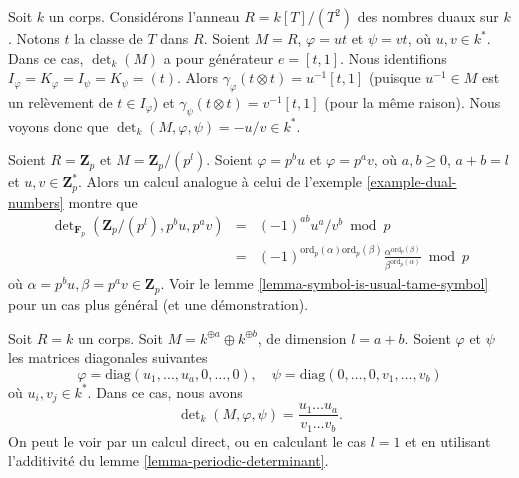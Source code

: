 \begin{example}
\label{example-dual-numbers}
Soit $k$ un corps.
Considérons l'anneau $R = k[T]/(T^2)$ des nombres duaux sur $k$.
Notons $t$ la classe de $T$ dans $R$.
Soient $M = R$, $\varphi = ut$ et $\psi = vt$, où $u, v \in k^*$.
Dans ce cas, $\det_k(M)$ a pour générateur $e = [t, 1]$.
Nous identifions $I_\varphi = K_\varphi = I_\psi = K_\psi = (t)$.
Alors $\gamma_\varphi(t \otimes t) = u^{-1}[t, 1]$
(puisque $u^{-1} \in M$ est un relèvement de $t \in I_\varphi$)
et $\gamma_\psi(t \otimes t) = v^{-1}[t, 1]$ (pour la même raison).
Nous voyons donc que $\det_k(M, \varphi, \psi) = -u/v \in k^*$.
\end{example}

\begin{example}
\label{example-Zp}
Soient $R = \mathbf{Z}_p$ et $M = \mathbf{Z}_p/(p^l)$.
Soient $\varphi = p^b u$ et $\varphi = p^a v$, où $a, b \geq 0$,
$a + b = l$ et $u, v \in \mathbf{Z}_p^*$.
Alors un calcul analogue à celui de l'exemple \ref{example-dual-numbers}
montre que
\begin{eqnarray*}
\det\nolimits_{\mathbf{F}_p}(\mathbf{Z}_p/(p^l), p^bu, p^av) & = &
(-1)^{ab}u^a/v^b \bmod p \\
& = &
(-1)^{\text{ord}_p(\alpha)\text{ord}_p(\beta)}
\frac{\alpha^{\text{ord}_p(\beta)}}{\beta^{\text{ord}_p(\alpha)}} \bmod p
\end{eqnarray*}
où $\alpha = p^bu, \beta = p^av \in \mathbf{Z}_p$.
Voir le lemme \ref{lemma-symbol-is-usual-tame-symbol}
pour un cas plus général (et une démonstration).
\end{example}

\begin{example}
\label{example-generic-vector-space}
Soit $R = k$ un corps.
Soit $M = k^{\oplus a} \oplus k^{\oplus b}$, de dimension $l = a + b$.
Soient $\varphi$ et $\psi$ les matrices diagonales suivantes
$$
\varphi = \text{diag}(u_1, \ldots, u_a, 0, \ldots, 0),
\quad
\psi = \text{diag}(0, \ldots, 0, v_1, \ldots, v_b)
$$
où $u_i, v_j \in k^*$. Dans ce cas, nous avons
$$
\det\nolimits_k(M, \varphi, \psi)
=
\frac{u_1 \ldots u_a}{v_1 \ldots v_b}.
$$
On peut le voir par un calcul direct, ou en calculant le cas $l = 1$
et en utilisant l'additivité du lemme \ref{lemma-periodic-determinant}.
\end{example}

